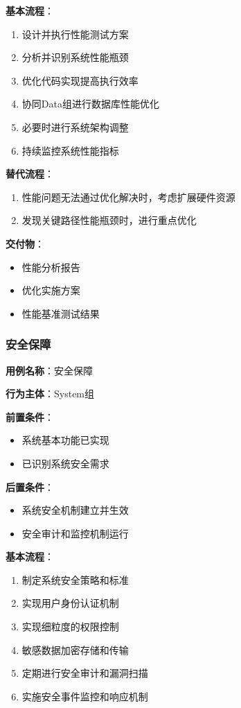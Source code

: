 \documentclass[a4paper,12pt]{article}
\begin{document}
\textbf{基本流程}：
\begin{enumerate}
  \item 设计并执行性能测试方案
  \item 分析并识别系统性能瓶颈
  \item 优化代码实现提高执行效率
  \item 协同Data组进行数据库性能优化
  \item 必要时进行系统架构调整
  \item 持续监控系统性能指标
\end{enumerate}

\textbf{替代流程}：
\begin{enumerate}
  \item 性能问题无法通过优化解决时，考虑扩展硬件资源
  \item 发现关键路径性能瓶颈时，进行重点优化
\end{enumerate}

\textbf{交付物}：
\begin{itemize}
  \item 性能分析报告
  \item 优化实施方案
  \item 性能基准测试结果
\end{itemize}

\subsubsection{安全保障}

\textbf{用例名称}：安全保障

\textbf{行为主体}：System组

\textbf{前置条件}：
\begin{itemize}
  \item 系统基本功能已实现
  \item 已识别系统安全需求
\end{itemize}

\textbf{后置条件}：
\begin{itemize}
  \item 系统安全机制建立并生效
  \item 安全审计和监控机制运行
\end{itemize}

\textbf{基本流程}：
\begin{enumerate}
  \item 制定系统安全策略和标准
  \item 实现用户身份认证机制
  \item 实现细粒度的权限控制
  \item 敏感数据加密存储和传输
  \item 定期进行安全审计和漏洞扫描
  \item 实施安全事件监控和响应机制
\end{enumerate}
\end{document}
